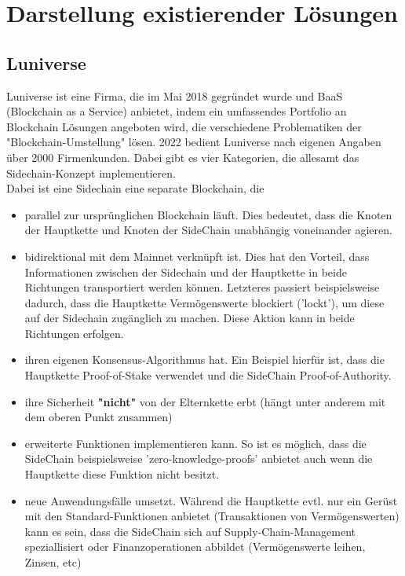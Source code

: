 \chapter{Darstellung existierender Lösungen}
\label{cha:existierende Lösungen}

\section{Luniverse}
Luniverse \cite{ID27} ist eine Firma, die im Mai 2018 gegründet wurde und BaaS (Blockchain as a Service) anbietet, indem ein umfassendes Portfolio an Blockchain Lösungen angeboten wird, die verschiedene Problematiken der "Blockchain-Umstellung" lösen. 2022 bedient Luniverse nach eigenen Angaben über 2000 Firmenkunden. Dabei gibt es vier Kategorien, die allesamt das Sidechain-Konzept implementieren. \\
Dabei ist eine Sidechain \cite{ID29} \cite{ID33} eine separate Blockchain, die 
\begin{itemize}
	\item parallel zur ursprünglichen Blockchain läuft. Dies bedeutet, dass die Knoten der Hauptkette und Knoten der SideChain unabhängig voneinander agieren.
	\item bidirektional mit dem Mainnet verknüpft ist. Dies hat den Vorteil, dass Informationen zwischen der Sidechain und der Hauptkette in beide Richtungen transportiert werden können. Letzteres passiert beispielsweise dadurch, dass die Hauptkette Vermögenswerte blockiert ('lockt'), um diese auf der Sidechain zugänglich zu machen. Diese Aktion kann in beide Richtungen erfolgen.
	
	\item ihren eigenen Konsensus-Algorithmus hat. Ein Beispiel hierfür ist, dass die Hauptkette Proof-of-Stake verwendet und die SideChain Proof-of-Authority.
	\item ihre Sicherheit \textbf{"nicht"} von der Elternkette erbt (hängt unter anderem mit dem oberen Punkt zusammen)
	\item erweiterte Funktionen implementieren kann. So ist es möglich, dass die SideChain beispielsweise 'zero-knowledge-proofs' anbietet auch wenn die Hauptkette diese Funktion nicht besitzt.
	\item neue Anwendungsfälle umsetzt. Während die Hauptkette evtl. nur ein Gerüst mit den Standard-Funktionen anbietet (Transaktionen von Vermögenswerten) kann es sein, dass die SideChain sich auf Supply-Chain-Management speziallisiert oder Finanzoperationen abbildet (Vermögenswerte leihen, Zinsen, etc)
\end{itemize}

